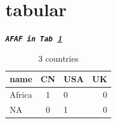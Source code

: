 \documentclass[12pt]{article} %
\newcommand{\myfont}[1]{\texttt{\textbf{\textit{#1}}}}
\begin{document}
    \section{tabular}
    \myfont{AFAF in Tab \ref{Tab3k}}
    \begin{table}[H]
        \centering
        \caption{\small 3 countries} \label{Tab3k}
        \begin{tabular}{l|c|p{5cm} r}
            \hline
            name & CN & USA & UK \\
            \hline
            Africa & 1 & 0 & 0 \\
            \hline
            NA & 0 & 1 & 0\\
            \hline
            \end{tabular}
    \end{table}

    
\end{document}
